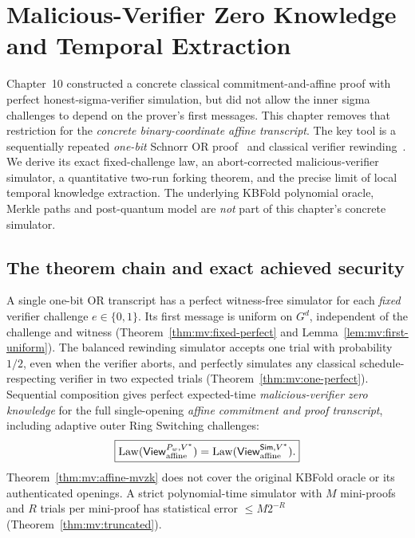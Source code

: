 \section{Malicious-Verifier Zero Knowledge and Temporal Extraction}\label{sec:mv}
Chapter~10 constructed a concrete classical commitment-and-affine
proof with perfect honest-sigma-verifier simulation, but did
not allow the inner sigma challenges to depend on the prover's
first messages. This chapter removes that restriction for the
\emph{concrete binary-coordinate affine transcript}.
The key tool is a sequentially repeated \emph{one-bit}
Schnorr OR proof~\cite{Schnorr1991,CramerDamgardSchoenmakers1994}
and classical verifier rewinding~\cite{Goldreich2001Foundations}.
We derive its exact fixed-challenge law, an abort-corrected
malicious-verifier simulator, a quantitative two-run
forking theorem, and the precise limit of local temporal
knowledge extraction. The underlying KBFold polynomial oracle,
Merkle paths and post-quantum model are \emph{not}
part of this chapter's concrete simulator.










\subsection{The theorem chain and exact achieved security}\label{sec:mv:conclusion}
A single one-bit OR transcript has a perfect
witness-free simulator for each \emph{fixed} verifier
challenge $e\in\{0,1\}$. Its first message is uniform
on $G^d$, independent of the challenge and witness
(Theorem~\ref{thm:mv:fixed-perfect} and
Lemma~\ref{lem:mv:first-uniform}).
The balanced rewinding simulator accepts one trial
with probability $1/2$, even when the verifier
aborts, and perfectly simulates any classical
schedule-respecting verifier in two expected
trials (Theorem~\ref{thm:mv:one-perfect}).
Sequential composition gives perfect
expected-time \emph{malicious-verifier zero knowledge}
for the full single-opening \emph{affine commitment
and proof transcript}, including adaptive
outer Ring Switching challenges:
\[
 \boxed{
 \operatorname{Law}(\mathsf{View}^{P_w,V^*}_{\rm affine})
 =
 \operatorname{Law}(\mathsf{View}^{\mathsf{Sim},V^*}_{\rm affine}).
 }
\]
Theorem~\ref{thm:mv:affine-mvzk} does not cover
the original KBFold oracle or its authenticated
openings. A strict polynomial-time simulator
with $M$ mini-proofs and $R$ trials per
mini-proof has statistical error
$\leq M2^{-R}$
(Theorem~\ref{thm:mv:truncated}).

